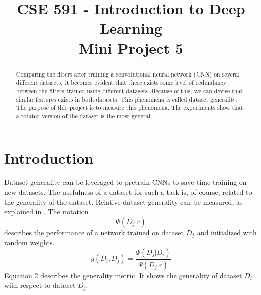 \documentclass[conference,compsoc]{IEEEtran}
\begin{document}
%
\title{CSE 591 - Introduction to Deep Learning\\Mini Project 5}


\author{
}

\maketitle

\begin{abstract}
Comparing the filters after training a convolutional neural network (CNN) on several different datasets, it becomes evident that there exists some level of redundancy between the filters trained using different datasets. Because of this, we can devise that similar features exists in both datasets. This phenomena is called dataset generality. The purpose of this project is to measure this phenomena. The experiments show that a rotated version of the dataset is the most general. 
\end{abstract}

\IEEEpeerreviewmaketitle


\section{Introduction}
Dataset generality can be leveraged to pretrain CNNs to save time training on new datasets. The usefulness of a dataset for such a task is, of course, related to the generality of the dataset. Relative dataset generality can be measured, as explained in \cite{DBLP:journals/corr/VenkatesanGL16}. The notation 
\begin{equation}
\Psi(D_j|r)
\end{equation}
describes the performance of a network trained on dataset $D_j$ and initialized with random weights. 
\begin{equation}
g(D_i, D_j) = \frac{\Psi(D_j|D_i)}{\Psi(D_j|r)}
\end{equation}
Equation 2 describes the generality metric. It shows the generality of dataset $D_i$ with respect to dataset $D_j$. 
\end{document}
